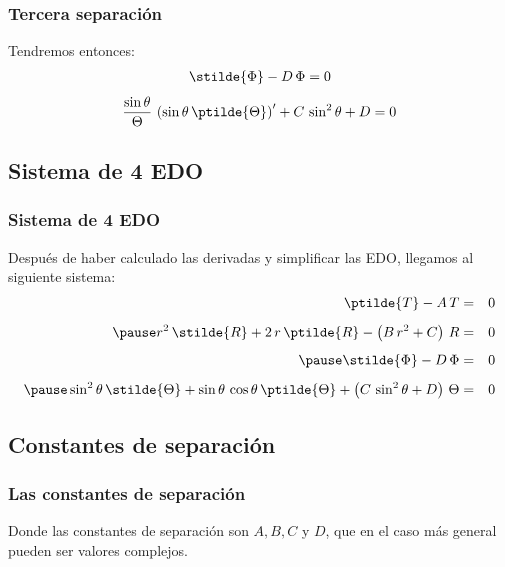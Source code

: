 \begin{frame}
\frametitle{Tercera separación}
Tendremos entonces:
\begin{align}
\stilde{\Phi} - D \, \Phi = 0
\label{eq:ecuacion_02_298}
\end{align}
\begin{align}
\dfrac{\sin \theta}{\Theta} \, \left( \sin \theta \, \ptilde{\Theta} \right)^{\prime} + C \, \sin^{2} \theta + D = 0
\label{eq:ecuacion_02_299}
\end{align}
\end{frame}
\subsection{Sistema de 4 EDO}
\begin{frame}
\frametitle{Sistema de 4 EDO}
Después de haber calculado las derivadas y simplificar las EDO, llegamos al siguiente sistema:
\fontsize{12}{12}\selectfont
\begin{eqnarray}
\ptilde{T} - A \, T &=&0 \label{eq:ecuacion_02_300} \\[0.5em] \pause
r^{2} \, \stilde{R} + 2 \, r \, \ptilde{R} - \left( B \, r^{2} + C \right) \, R &=& 0 \label{eq:ecuacion_02_301} \\[0.5em] \pause
\stilde{\Phi} - D \, \Phi &=& 0 \label{eq:ecuacion_02_302} \\[0.5em] \pause
\sin^{2} \theta \, \stilde{\Theta} + \sin \theta \, \cos \theta \, \ptilde{\Theta} + \left( C \, \sin^{2} \theta + D \right) \, \Theta &=& 0 \label{eq:ecuacion_02_303}
\end{eqnarray}
\end{frame}
\subsection*{Constantes de separación}
\begin{frame}
\frametitle{Las constantes de separación}
Donde las constantes de separación son $A, B, C$ y $D$, que en el caso más general pueden ser valores complejos.
\end{frame}
